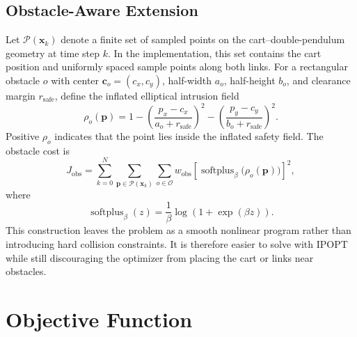 \documentclass[conference]{IEEEtran}
\begin{document}
\subsection{Obstacle-Aware Extension}
Let $\mathcal{P}(\bm{x}_k)$ denote a finite set of sampled points on the cart--double-pendulum geometry at time step $k$. In the implementation, this set contains the cart position and uniformly spaced sample points along both links. For a rectangular obstacle $o$ with center $\bm{c}_o=(c_x,c_y)$, half-width $a_o$, half-height $b_o$, and clearance margin $r_{\mathrm{safe}}$, define the inflated elliptical intrusion field
\begin{equation}
\rho_o(\bm{p})
=
1
-
\left(\frac{p_x-c_x}{a_o+r_{\mathrm{safe}}}\right)^2
-
\left(\frac{p_y-c_y}{b_o+r_{\mathrm{safe}}}\right)^2 .
\end{equation}
Positive $\rho_o$ indicates that the point lies inside the inflated safety field. The obstacle cost is
\begin{equation}
J_{\mathrm{obs}}
=
\sum_{k=0}^{N}
\sum_{\bm{p}\in\mathcal{P}(\bm{x}_k)}
\sum_{o\in\mathcal{O}}
w_{\mathrm{obs}}
\left[
\operatorname{softplus}_{\beta}
\big(\rho_o(\bm{p})\big)
\right]^2 ,
\label{eq:obstaclecost}
\end{equation}
where
\begin{equation}
\operatorname{softplus}_{\beta}(z)
=
\frac{1}{\beta}\log(1+\exp(\beta z)).
\end{equation}
This construction leaves the problem as a smooth nonlinear program rather than introducing hard collision constraints. It is therefore easier to solve with IPOPT while still discouraging the optimizer from placing the cart or links near obstacles.

\section{Objective Function}
\end{document}
